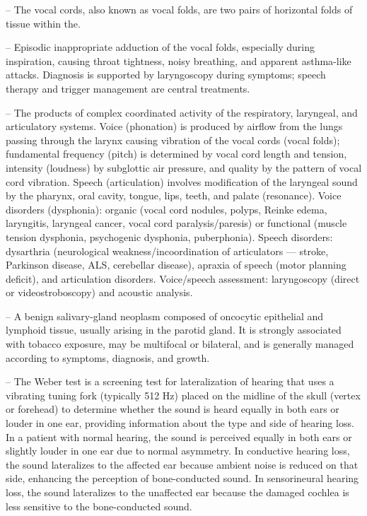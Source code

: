 -- The vocal cords, also known as vocal folds, are two pairs of horizontal folds of tissue within the.

-- Episodic inappropriate adduction of the vocal folds, especially during inspiration, causing throat tightness, noisy breathing, and apparent asthma-like attacks. Diagnosis is supported by laryngoscopy during symptoms; speech therapy and trigger management are central treatments.

-- The products of complex coordinated activity of the respiratory, laryngeal, and articulatory systems. Voice (phonation) is produced by airflow from the lungs passing through the larynx causing vibration of the vocal cords (vocal folds); fundamental frequency (pitch) is determined by vocal cord length and tension, intensity (loudness) by subglottic air pressure, and quality by the pattern of vocal cord vibration. Speech (articulation) involves modification of the laryngeal sound by the pharynx, oral cavity, tongue, lips, teeth, and palate (resonance). Voice disorders (dysphonia): organic (vocal cord nodules, polyps, Reinke edema, laryngitis, laryngeal cancer, vocal cord paralysis/paresis) or functional (muscle tension dysphonia, psychogenic dysphonia, puberphonia). Speech disorders: dysarthria (neurological weakness/incoordination of articulators — stroke, Parkinson disease, ALS, cerebellar disease), apraxia of speech (motor planning deficit), and articulation disorders. Voice/speech assessment: laryngoscopy (direct or videostroboscopy) and acoustic analysis.

-- A benign salivary-gland neoplasm composed of oncocytic epithelial and lymphoid tissue, usually arising in the parotid gland. It is strongly associated with tobacco exposure, may be multifocal or bilateral, and is generally managed according to symptoms, diagnosis, and growth.

-- The Weber test is a screening test for lateralization of hearing that uses a vibrating tuning fork (typically 512 Hz) placed on the midline of the skull (vertex or forehead) to determine whether the sound is heard equally in both ears or louder in one ear, providing information about the type and side of hearing loss. In a patient with normal hearing, the sound is perceived equally in both ears or slightly louder in one ear due to normal asymmetry. In conductive hearing loss, the sound lateralizes to the affected ear because ambient noise is reduced on that side, enhancing the perception of bone-conducted sound. In sensorineural hearing loss, the sound lateralizes to the unaffected ear because the damaged cochlea is less sensitive to the bone-conducted sound.

